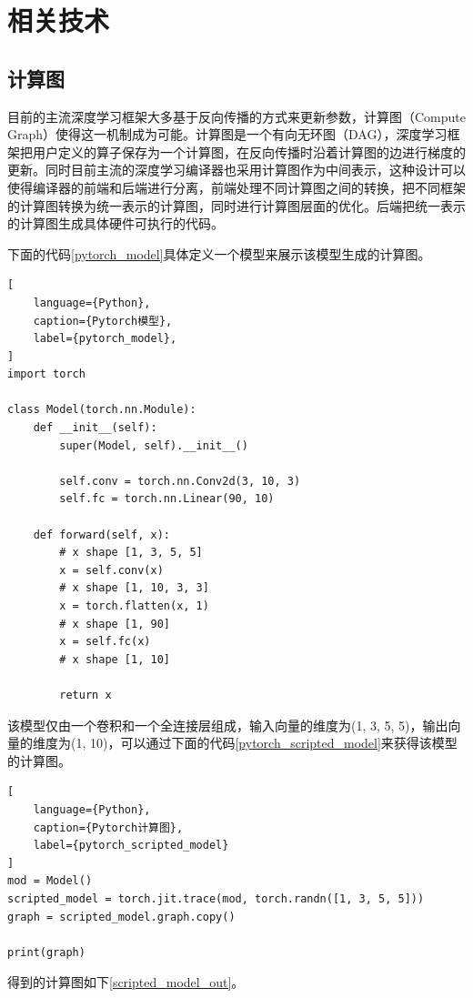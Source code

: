 \chapter{相关技术}


\section{计算图}

目前的主流深度学习框架大多基于反向传播的方式来更新参数，计算图（Compute Graph）使得这一机制成为可能。计算图是一个有向无环图（DAG），深度学习框架把用户定义的算子保存为一个计算图，在反向传播时沿着计算图的边进行梯度的更新。同时目前主流的深度学习编译器也采用计算图作为中间表示，这种设计可以使得编译器的前端和后端进行分离，前端处理不同计算图之间的转换，把不同框架的计算图转换为统一表示的计算图，同时进行计算图层面的优化。后端把统一表示的计算图生成具体硬件可执行的代码。

下面的代码\ref{pytorch_model}具体定义一个模型来展示该模型生成的计算图。

\begin{lstlisting}[
    language={Python},
    caption={Pytorch模型},
    label={pytorch_model},
]
import torch

class Model(torch.nn.Module):
    def __init__(self):
        super(Model, self).__init__()

        self.conv = torch.nn.Conv2d(3, 10, 3)
        self.fc = torch.nn.Linear(90, 10)

    def forward(self, x):
        # x shape [1, 3, 5, 5]
        x = self.conv(x)
        # x shape [1, 10, 3, 3]
        x = torch.flatten(x, 1)
        # x shape [1, 90]
        x = self.fc(x)
        # x shape [1, 10]

        return x
\end{lstlisting}

该模型仅由一个卷积和一个全连接层组成，输入向量的维度为(1, 3, 5, 5)，输出向量的维度为(1, 10)，可以通过下面的代码\ref{pytorch_scripted_model}来获得该模型的计算图。

\begin{lstlisting}[
    language={Python},
    caption={Pytorch计算图},
    label={pytorch_scripted_model}
]
mod = Model()
scripted_model = torch.jit.trace(mod, torch.randn([1, 3, 5, 5]))
graph = scripted_model.graph.copy()

print(graph)
\end{lstlisting}

得到的计算图如下\ref{scripted_model_out}。

